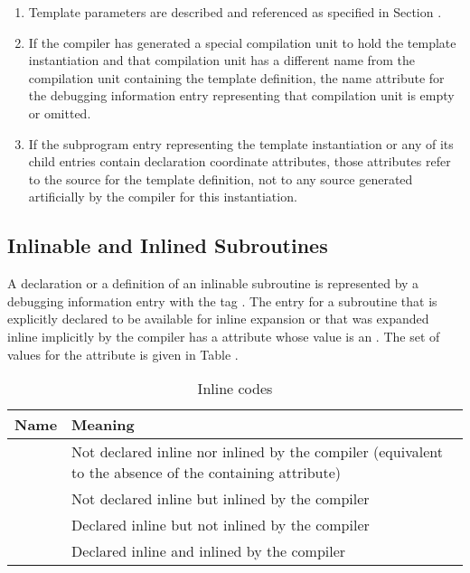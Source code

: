 \begin{enumerate}[1. ]
\item Template parameters are described and referenced as specified in
Section .

\item If the compiler has generated a special compilation unit
to hold the template instantiation and that compilation unit
has a different name from the compilation unit containing
the template definition, the name attribute for the debugging
information entry representing that compilation unit is empty
or omitted.

\item If the subprogram entry representing the template
instantiation or any of its child entries contain declaration
coordinate attributes, those attributes refer to the source
for the template definition, not to any source generated
artificially by the compiler for this instantiation.
\end{enumerate}


\subsection{Inlinable and Inlined Subroutines}
\label{chap:inlinedsubroutines}
A declaration or a definition of an inlinable subroutine
is represented by a debugging information entry with the
tag 
\DWTAGsubprogram.
The entry for a 
subroutine that is
\hypertarget{chap:DWATinlineinlinedsubroutine}{}
explicitly declared to be available for inline expansion or
that was expanded inline implicitly by the compiler has 
a
\DWATinline{} attribute whose value is an 
. The
set of values for the \DWATinline{} attribute is given in
Table .

\begin{table}[here]
\centering
\caption{Inline codes}
\label{tab:inlinecodes}
\begin{tabular}{l|p{8cm}}
\hline
Name&Meaning\\ \hline
\DWINLnotinlinedTARG{} & Not declared inline nor inlined by the
  \mbox{compiler} (equivalent to the absence of the
  containing \DWATinline{} attribute) \\
\DWINLinlinedTARG{} & Not declared inline but inlined by the \mbox{compiler} \\
\DWINLdeclarednotinlinedTARG{} & Declared inline but 
  not inlined by the \mbox{compiler} \\
\DWINLdeclaredinlinedTARG{} & Declared inline and inlined by the 
  \mbox{compiler} \\
\hline
\end{tabular}
\end{table}


